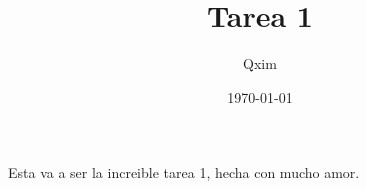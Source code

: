 \documentclass[11pt]{article}
\title{Tarea 1}
\author{Qxim}
\date{\today}
\begin{document}
\maketitle

Esta va a ser la increible tarea 1, hecha con mucho amor.
\end{document}
